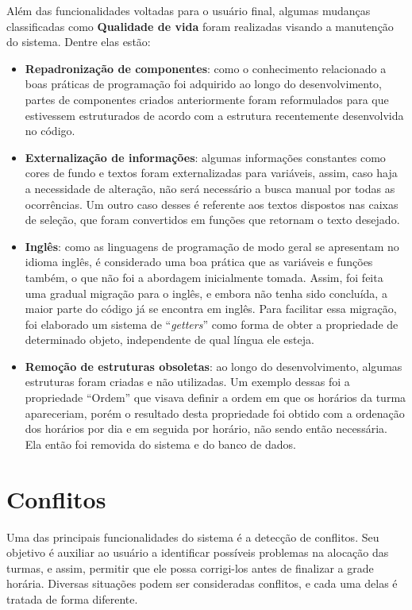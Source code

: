 Além das funcionalidades voltadas para o usuário final, algumas mudanças classificadas como \textbf{Qualidade de vida} foram realizadas visando a manutenção do sistema. Dentre elas estão:

\begin{itemize}
  \item \textbf{Repadronização de componentes}: como o conhecimento relacionado a boas práticas de programação foi adquirido ao longo do desenvolvimento, partes de componentes criados anteriormente foram reformulados para que estivessem estruturados de acordo com a estrutura recentemente desenvolvida no código.
  \item \textbf{Externalização de informações}: algumas informações constantes como cores de fundo e textos foram externalizadas para variáveis, assim, caso haja a necessidade de alteração, não será necessário a busca manual por todas as ocorrências. Um outro caso desses é referente aos textos dispostos nas caixas de seleção, que foram convertidos em funções que retornam o texto desejado.
  \item \textbf{Inglês}: como as linguagens de programação de modo geral se apresentam no idioma inglês, é considerado uma boa prática que as variáveis e funções também, o que não foi a abordagem inicialmente tomada. Assim, foi feita uma gradual migração para o inglês, e embora não tenha sido concluída, a maior parte do código já se encontra em inglês. Para facilitar essa migração, foi elaborado um sistema de ``\textit{getters}'' como forma de obter a propriedade de determinado objeto, independente de qual língua ele esteja.
  \item \textbf{Remoção de estruturas obsoletas}: ao longo do desenvolvimento, algumas estruturas foram criadas e não utilizadas. Um exemplo dessas foi a propriedade ``Ordem'' que visava definir a ordem em que os horários da turma apareceriam, porém o resultado desta propriedade foi obtido com a ordenação dos horários por dia e em seguida por horário, não sendo então necessária. Ela então foi removida do sistema e do banco de dados.
\end{itemize}

\section{Conflitos}\label{sec:conflitos} %

Uma das principais funcionalidades do sistema é a detecção de conflitos. Seu objetivo é auxiliar ao usuário a identificar possíveis problemas na alocação das turmas, e assim, permitir que ele possa corrigi-los antes de finalizar a grade horária. Diversas situações podem ser consideradas conflitos, e cada uma delas é tratada de forma diferente.

